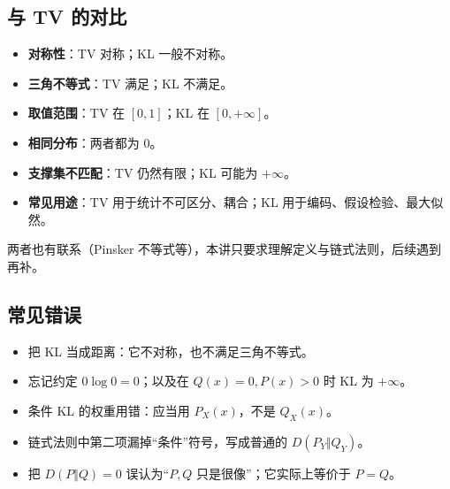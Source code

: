 \subsection{与 TV 的对比}


\begin{itemize}
\item \textbf{对称性}：TV 对称；KL 一般不对称。
\item \textbf{三角不等式}：TV 满足；KL 不满足。
\item \textbf{取值范围}：TV 在 $[0,1]$；KL 在 $[0,+\infty]$。
\item \textbf{相同分布}：两者都为 $0$。
\item \textbf{支撑集不匹配}：TV 仍然有限；KL 可能为 $+\infty$。
\item \textbf{常见用途}：TV 用于统计不可区分、耦合；KL 用于编码、假设检验、最大似然。
\end{itemize}


两者也有联系（Pinsker 不等式等），本讲只要求理解定义与链式法则，后续遇到再补。

\subsection{常见错误}


\begin{itemize}
\item 把 KL 当成距离：它不对称，也不满足三角不等式。
\item 忘记约定 $0\log0=0$；以及在 $Q(x)=0,P(x)>0$ 时 KL 为 $+\infty$。
\item 条件 KL 的权重用错：应当用 $P_X(x)$，不是 $Q_X(x)$。
\item 链式法则中第二项漏掉“条件”符号，写成普通的 $D(P_Y\Vert Q_Y)$。
\item 把 $D(P\Vert Q)=0$ 误认为“$P,Q$ 只是很像”；它实际上等价于 $P=Q$。
\end{itemize}
